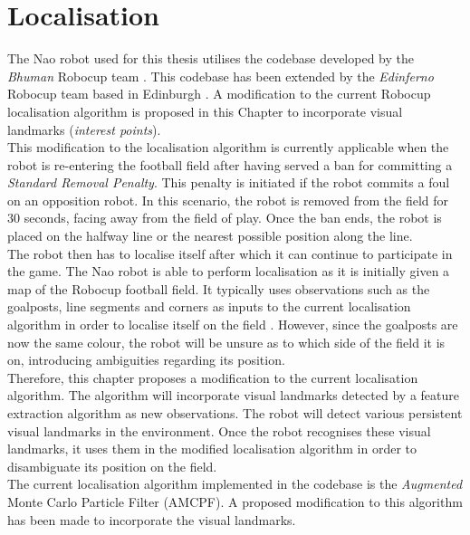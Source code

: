 \chapter{Localisation}
\label{sec:localisation}
The Nao robot used for this thesis utilises the codebase developed by the \textit{Bhuman} Robocup team \citep{Bhuman}. This codebase has been extended by the \textit{Edinferno} Robocup team based in Edinburgh \citep{edinferno}. A modification to the current Robocup localisation algorithm is proposed in this Chapter to incorporate visual landmarks (\textit{interest points}).\\

This modification to the localisation algorithm is currently applicable when the robot is re-entering the football field after having served a ban for committing a \textit{Standard Removal Penalty}\citep{Rules}. This penalty is initiated if the robot commits a foul on an opposition robot. In this scenario, the robot is removed from the field for $30$ seconds, facing away from the field of play. Once the ban ends, the robot is placed on the halfway line or the nearest possible position along the line.  \\

The robot then has to localise itself after which it can continue to participate in the game. The Nao robot is able to perform localisation as it is initially given a map of the Robocup football field. It typically uses observations such as the goalposts, line segments and corners as inputs to the current localisation algorithm in order to localise itself on the field \citep{Bhuman}. However, since the goalposts are now the same colour, the robot will be unsure as to which side of the field it is on, introducing ambiguities regarding its position.\\

Therefore, this chapter proposes a modification to the current localisation algorithm. The algorithm will incorporate visual landmarks detected by a feature extraction algorithm as new observations. The robot will detect various persistent visual landmarks in the environment. Once the robot recognises these visual landmarks, it uses them in the modified localisation algorithm in order to disambiguate its position on the field.\\

The current localisation algorithm implemented in the codebase is the \textit{Augmented} Monte Carlo Particle Filter (AMCPF)\citep{Laue}. A proposed modification to this algorithm has been made to incorporate the visual landmarks.\\


